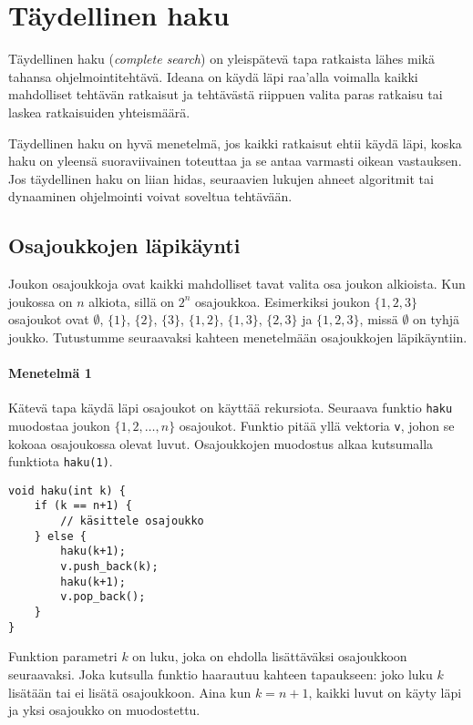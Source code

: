 \chapter{Täydellinen haku}

Täydellinen haku (\textit{complete search})
on yleispätevä tapa ratkaista
lähes mikä tahansa ohjelmointitehtävä.
Ideana on käydä läpi raa'alla voimalla kaikki
mahdolliset tehtävän ratkaisut ja tehtävästä riippuen
valita paras ratkaisu
tai laskea ratkaisuiden yhteismäärä.
          
Täydellinen haku on hyvä menetelmä, jos kaikki
ratkaisut ehtii käydä läpi,
koska haku on yleensä suoraviivainen toteuttaa
ja se antaa varmasti oikean vastauksen.
Jos täydellinen haku on liian hidas,
seuraavien lukujen ahneet algoritmit tai
dynaaminen ohjelmointi voivat soveltua
tehtävään.

\section{Osajoukkojen läpikäynti}

Joukon osajoukkoja ovat kaikki mahdolliset
tavat valita osa joukon alkioista.
Kun joukossa on $n$ alkiota,
sillä on $2^n$ osajoukkoa.
Esimerkiksi joukon $\{1,2,3\}$
osajoukot ovat $\emptyset$,
$\{1\}$, $\{2\}$, $\{3\}$,
$\{1,2\}$, $\{1,3\}$, $\{2,3\}$ ja $\{1,2,3\}$,
missä $\emptyset$ on tyhjä joukko.
Tutustumme seuraavaksi kahteen menetelmään
osajoukkojen läpikäyntiin.

\subsubsection{Menetelmä 1}

Kätevä tapa käydä läpi osajoukot on
käyttää rekursiota.
Seuraava funktio \texttt{haku} muodostaa
joukon $\{1,2,\ldots,n\}$ osajoukot.
Funktio pitää yllä vektoria \texttt{v},
johon se kokoaa osajoukossa olevat luvut.
Osajoukkojen muodostus alkaa kutsumalla
funktiota \texttt{haku(1)}.

\begin{lstlisting}
void haku(int k) {
    if (k == n+1) {
        // käsittele osajoukko
    } else {
        haku(k+1);
        v.push_back(k);
        haku(k+1);
        v.pop_back();
    }
}
\end{lstlisting}

Funktion parametri $k$ on luku,
joka on ehdolla lisättäväksi osajoukkoon seuraavaksi.
Joka kutsulla funktio haarautuu kahteen tapaukseen:
joko luku $k$ lisätään tai ei lisätä osajoukkoon.
Aina kun $k=n+1$, kaikki luvut on käyty läpi
ja yksi osajoukko on muodostettu.

